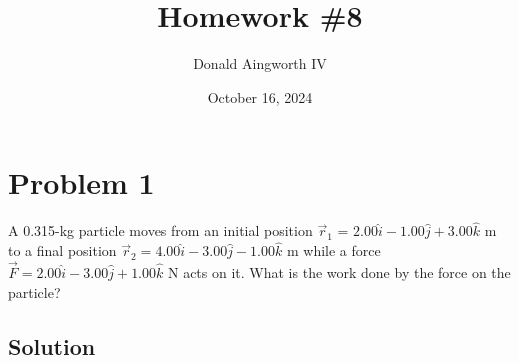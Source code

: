 \documentclass[12pt]{article}
\title{Homework \#8}
\author{Donald Aingworth IV}
\date{October 16, 2024}
\begin{document}

\maketitle
\pagebreak
\section*{Problem 1}
A 0.315-kg particle moves from an initial position $\vec{r}_1$ = $2.00 \hat{i} - 1.00 \hat{j} + 3.00 \hat{k}$ m to a final position $\vec{r}_2 = 4.00 \hat{i} - 3.00 \hat{j} - 1.00 \hat{k}$ m while a force $\vec{F} = 2.00 \hat{i} - 3.00 \hat{j} + 1.00 \hat{k}$ N acts on it. What is the work done by the force on the particle?

\subsection*{Solution}







\end{document}
